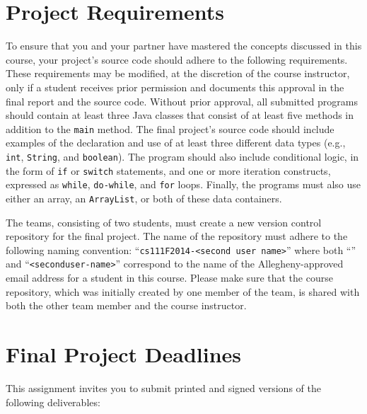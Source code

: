 \vspace*{-.15in}

\section*{Project Requirements}

To ensure that you and your partner have mastered the concepts discussed in this course, your project's source code
should adhere to the following requirements. These requirements may be modified, at the discretion of the course
instructor, only if a student receives prior permission and documents this approval in the final report and the source
code. Without prior approval, all submitted programs should contain at least three Java classes that consist of at least
five methods in addition to the {\tt main} method. The final project's source code should include examples of the
declaration and use of at least three different data types (e.g., {\tt int}, {\tt String}, and {\tt boolean}). The
program should also include conditional logic, in the form of {\tt if} or {\tt switch} statements, and one or more
iteration constructs, expressed as {\tt while}, {\tt do-while}, and {\tt for} loops. Finally, the programs must also use
either an array, an {\tt ArrayList}, or both of these data containers. 

The teams, consisting of two students, must create a new version control repository for the final project.  The name of
the repository must adhere to the following naming convention: ``{\tt cs111F2014-<second user
  name>}'' where both ``{\tt <first-user-name>}'' and ``{\tt <second\-user-name>}'' correspond to the name of the
Allegheny-approved email address for a student in this course. Please make sure that the course repository, which was
initially created by one member of the team, is shared with both the other team member and the course instructor.

\section*{Final Project Deadlines}

This assignment invites you to submit printed and signed versions of the following deliverables: 

